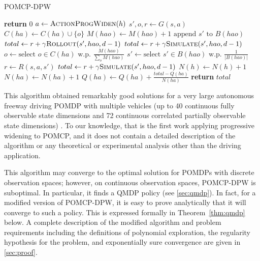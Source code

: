 \setcounter{algorithm}{0}
\begin{algorithm}[htbp]
    \caption{POMCP-DPW} \label{alg:pomcpdpw}
    \begin{algorithmic}[1]
                \State \textbf{return} $0$
            \EndIf
            \State $a \gets \Call{ActionProgWiden}{h}$
                \State $s',o,r \gets G(s,a)$
                \State $C(ha) \gets C(ha) \cup \{o\}$
                \State $M(hao) \gets M(hao) + 1$
                \State $\text{append } s' \text{ to } B(hao)$ \label{lin:insertion}
                    \State $total \gets r + \gamma \Call{Rollout}{s', hao, d-1}$
                \Else
                    \State $total \gets r + \gamma \Call{Simulate}{s', hao, d-1}$
                \EndIf
            \Else \label{lin:notnew}
                \State $o \gets \text{select } o \in C(ha) \text{ w.p. } \frac{M(hao)}{\sum_{o} M(hao)}$ \label{lin:selecto}
                \State $s' \gets \text{select } s' \in B(hao) \text{ w.p. } \frac{1}{|B(hao)|}$ \label{lin:samples}
                \State $r \gets R(s,a,s')$
                \State $total \gets r + \gamma \Call{Simulate}{s', hao, d-1}$
            \EndIf
            \State $N(h) \gets N(h)+1$
            \State $N(ha) \gets N(ha)+1$
            \State $Q(ha) \gets Q(ha) + \frac{total - Q(ha)}{N(ha)}$
            \State \textbf{return} $total$
        \EndProcedure
    \end{algorithmic}
\end{algorithm}

This algorithm obtained remarkably good solutions for a very large autonomous freeway driving POMDP with multiple vehicles (up to 40 continuous fully observable state dimensions and 72 continuous correlated partially observable state dimensions) \cite{sunberg2017value}.
To our knowledge, that is the first work applying progressive widening to POMCP, and it does not contain a detailed description of the algorithm or any theoretical or experimental analysis other than the driving application.

This algorithm may converge to the optimal solution for POMDPs with discrete observation spaces; however, on continuous observation spaces, POMCP-DPW is suboptimal.
In particular, it finds a QMDP policy (see \cref{sec:qmdp}).
In fact, for a modified version of POMCP-DPW, it is easy to prove analytically that it will converge to such a policy.
This is expressed formally in Theorem~\ref{thm:qmdp} below.
A complete description of the modified algorithm and problem requirements including the definitions of polynomial exploration, the regularity hypothesis for the problem, and exponentially sure convergence are given in \cref{sec:proof}.

